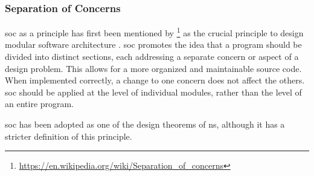 \subsubsection*{Separation of Concerns} \label{subsubsec:soc}

\gls{soc} as a principle has first been mentioned by
\citeauthor{dijkstra_selected_1982}\footnote{\url{https://en.wikipedia.org/wiki/Separation_of_concerns}}
as the crucial principle to design modular software architecture
\parencite[]{dijkstra_selected_1982}. \gls{soc} promotes the idea that a program should be
divided into distinct sections, each addressing a separate concern or aspect of a design
problem. This allows for a more organized and maintainable source code. When implemented
correctly, a change to one concern does not affect the others. \gls{soc} should be applied
at the level of individual modules, rather than the level of an entire program.

\gls{soc} has been adopted as one of the design theorems of \gls{ns}, although it has a
stricter definition of this principle\parencite{mannaert_normalized_2016}.

